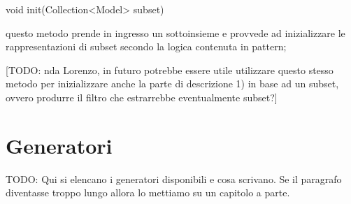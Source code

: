 \begin{java}
    void init(Collection<Model> subset) 
\end{java}

questo metodo prende in ingresso un sottoinsieme e provvede ad inizializzare le rappresentazioni di subset secondo la logica contenuta in pattern; 

[TODO: nda Lorenzo, in futuro potrebbe essere utile utilizzare questo stesso metodo per inizializzare anche la parte di descrizione 1) in base ad un subset, ovvero produrre il filtro che estrarrebbe eventualmente subset?]


\section{Generatori}\label{sec:generatori}
TODO: Qui si elencano i generatori disponibili e cosa scrivano. Se il paragrafo diventasse troppo lungo allora lo mettiamo su un capitolo a parte.